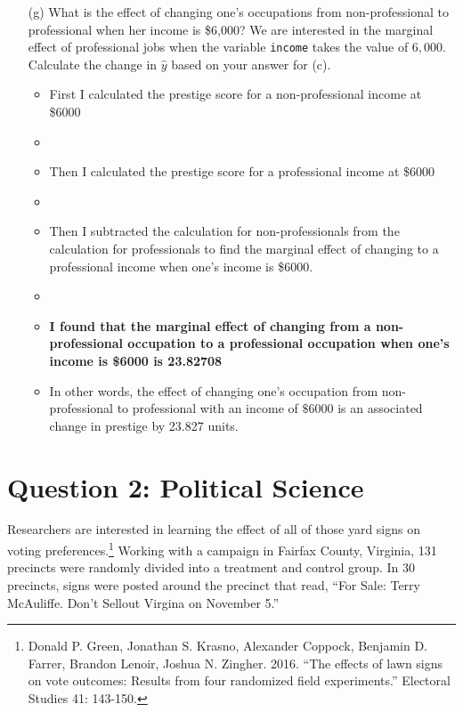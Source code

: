 \documentclass[12pt,letterpaper]{article}
\begin{document}
\begin{enumerate}
\newpage
	\item [(g)]
	What is the effect of changing one's occupations from non-professional to professional when her income is \$6,000? We are interested in the marginal effect of professional jobs when the variable \texttt{income} takes the value of $6,000$. Calculate the change in $\hat{y}$ based on your answer for (c).
	

	
\begin{itemize}
		\item First I calculated the prestige score for a non-professional income at \$6000
		\item 
		\item Then I calculated the prestige score for a professional income at \$6000
		\item 
		\item Then I subtracted the calculation for non-professionals from the calculation for professionals to find the marginal effect of changing to a professional income when one's income is \$6000.
		\item 
		\item \textbf{I found that the marginal effect of changing from a non-professional occupation to a professional occupation when one's income is \$6000 is 23.82708}
		\item In other words, the effect of changing one's occupation from non-professional to professional with an income of $\$6000$ is an associated change in prestige by 23.827 units.
	
\end{itemize}
	
	
\end{enumerate}

\newpage

\section*{Question 2: Political Science}
\vspace{.25cm}
\noindent 	Researchers are interested in learning the effect of all of those yard signs on voting preferences.\footnote{Donald P. Green, Jonathan	S. Krasno, Alexander Coppock, Benjamin D. Farrer,	Brandon Lenoir, Joshua N. Zingher. 2016. ``The effects of lawn signs on vote outcomes: Results from four randomized field experiments.'' Electoral Studies 41: 143-150. } Working with a campaign in Fairfax County, Virginia, 131 precincts were randomly divided into a treatment and control group. In 30 precincts, signs were posted around the precinct that read, ``For Sale: Terry McAuliffe. Don't Sellout Virgina on November 5.'' \\
\end{document}
